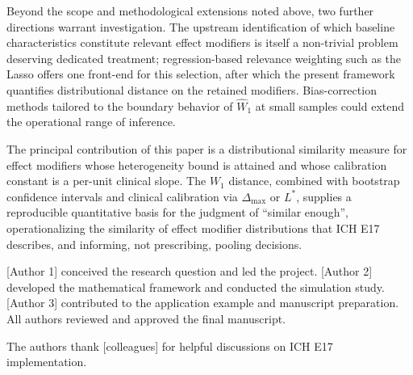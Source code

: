 \documentclass[AMA,Times1COL]{WileyNJDv5}
\begin{document}
Beyond the scope and methodological extensions noted above, two further directions warrant investigation. The upstream identification of which baseline characteristics constitute relevant effect modifiers is itself a non-trivial problem deserving dedicated treatment; regression-based relevance weighting such as the Lasso offers one front-end for this selection,\cite{komiyama2024} after which the present framework quantifies distributional distance on the retained modifiers. Bias-correction methods tailored to the boundary behavior of $\widehat{W}_1$ at small samples could extend the operational range of inference.

The principal contribution of this paper is a distributional similarity measure for effect modifiers whose heterogeneity bound is attained and whose calibration constant is a per-unit clinical slope. The $W_1$ distance, combined with bootstrap confidence intervals and clinical calibration via $\Delta_{\max}$ or $L^*$, supplies a reproducible quantitative basis for the judgment of ``similar enough'', operationalizing the similarity of effect modifier distributions that ICH E17 describes, and informing, not prescribing, pooling decisions.



[Author 1] conceived the research question and led the project. [Author 2] developed the mathematical framework and conducted the simulation study. [Author 3] contributed to the application example and manuscript preparation. All authors reviewed and approved the final manuscript.


The authors thank [colleagues] for helpful discussions on ICH E17 implementation.

\end{document}
